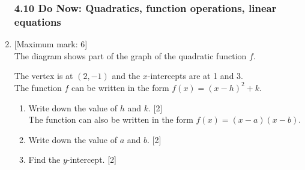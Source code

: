 \documentclass[12pt, twoside]{article}
\begin{document}
\begin{enumerate}
    \subsubsection*{4.10 Do Now: Quadratics, function operations, linear equations}
    \item {[Maximum mark: 6]} \\[0.3cm]
    The diagram shows part of the graph of the quadratic function $f$. 
         \begin{center}
         \end{center}
         The vertex is at $(2, -1)$ and the $x$-intercepts are at 1 and 3.\\[0.25cm]
         The function $f$ can be written in the form $f(x)=(x-h)^2+k$.
         \begin{enumerate}%
             \item Write down the value of $h$ and $k$. \hfill [2]\\[0.25cm]
             The function can also be written in the form $f(x)=(x-a)(x-b)$.
             \item Write down the value of $a$ and $b$. \hfill [2]
             \item Find the $y$-intercept. \hfill [2]
         \end{enumerate}


\end{enumerate}
\end{document}

